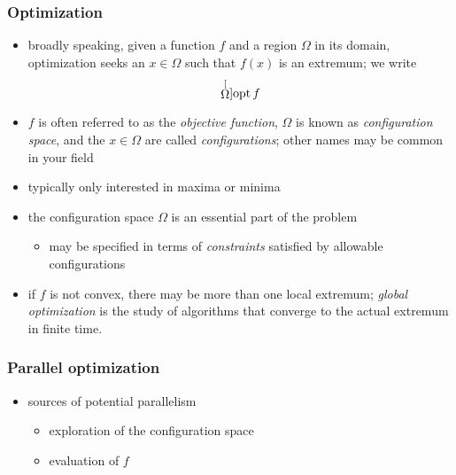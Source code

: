 %
%
%
%


\begin{frame}[fragile]
%
  \frametitle{Optimization}
%
  \begin{itemize}
%
  \item broadly speaking, given a function $f$ and a region $\Omega$ in its domain,
    optimization seeks an $x \in \Omega$ such that $f(x)$ is an extremum; we write
    \begin{equation}
      \stackrel[\Omega]{}{\mbox{\rm opt}}\, f
    \end{equation}
% 
    \item $f$ is often referred to as the {\em objective function}, $\Omega$ is known as {\em
        configuration space}, and the $x \in \Omega$ are called {\em configurations}; other
      names may be common in your field
%
    \item typically only interested in maxima or minima
%
    \item the configuration space $\Omega$ is an essential part of the problem
      \begin{itemize}
      \item may be specified in terms of {\em constraints} satisfied by allowable
        configurations
      \end{itemize}
%
  \item if $f$ is not convex, there may be more than one local extremum; {\em global
      optimization} is the study of algorithms that converge to the actual extremum in finite
    time.
%
  \end{itemize}
%
\end{frame}

\begin{frame}[fragile]
%
  \frametitle{Parallel optimization}
%
  \begin{itemize}
%
  \item sources of potential parallelism
    \begin{itemize}
    \item exploration of the configuration space
    \item evaluation of $f$
    \end{itemize}
%
  \end{itemize}
%
\end{frame}


